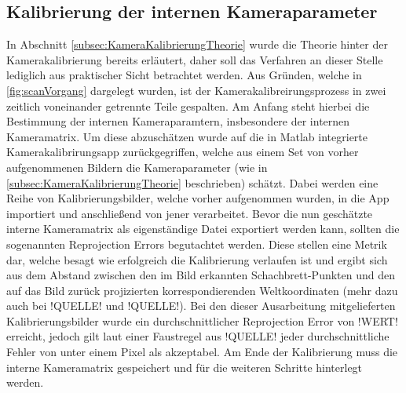 \subsection{Kalibrierung der internen Kameraparameter}
\label{subsec:interneKalibrierung}
In Abschnitt \ref{subsec:KameraKalibrierungTheorie} wurde die Theorie hinter der Kamerakalibrierung bereits erläutert, daher soll das Verfahren an dieser Stelle lediglich aus praktischer Sicht betrachtet werden. Aus Gründen, welche in \ref{fig:scanVorgang} dargelegt wurden, ist der Kamerakalibreirungsprozess in zwei zeitlich voneinander getrennte Teile gespalten. Am Anfang steht hierbei die Bestimmung der internen Kameraparamtern, insbesondere der internen Kameramatrix. Um diese abzuschätzen wurde auf die in Matlab integrierte Kamerakalibrirungsapp zurückgegriffen, welche aus einem Set von vorher aufgenommenen Bildern die Kameraparameter (wie in \ref{subsec:KameraKalibrierungTheorie} beschrieben) schätzt. Dabei werden eine Reihe von Kalibrierungsbilder, welche vorher aufgenommen wurden, in die App importiert und anschließend von jener verarbeitet. Bevor die nun geschätzte interne Kameramatrix als eigenständige Datei exportiert werden kann, sollten die sogenannten Reprojection Errors begutachtet werden. Diese stellen eine Metrik dar, welche besagt wie erfolgreich die Kalibrierung verlaufen ist und ergibt sich aus dem Abstand zwischen den im Bild erkannten Schachbrett-Punkten und den auf das Bild zurück projizierten korrespondierenden Weltkoordinaten (mehr dazu auch bei !QUELLE! und !QUELLE!). Bei den dieser Ausarbeitung mitgelieferten Kalibrierungsbilder wurde ein durchschnittlicher Reprojection Error von !WERT! erreicht, jedoch gilt laut einer Faustregel aus !QUELLE! jeder durchschnittliche Fehler von unter einem Pixel als akzeptabel. Am Ende der Kalibrierung muss die interne Kameramatrix gespeichert und für die weiteren Schritte hinterlegt werden.  

